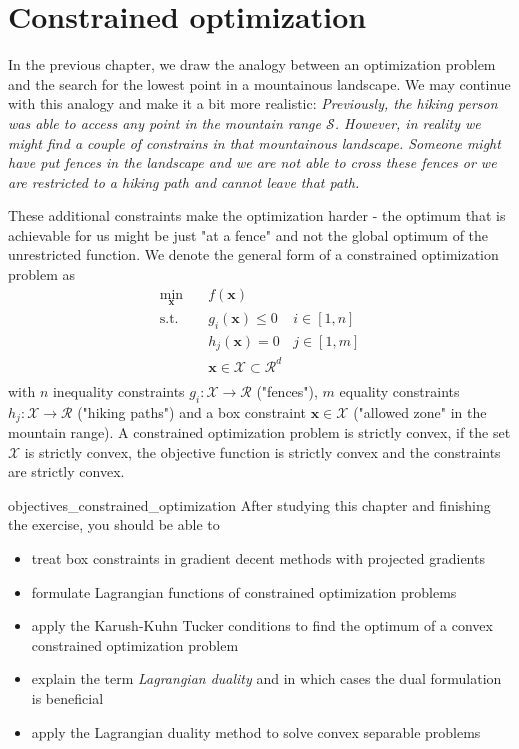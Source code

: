 \chapter{Constrained optimization}
In the previous chapter, we draw the analogy between an optimization problem and the search for the lowest point in a mountainous landscape. We may continue with this analogy and make it a bit more realistic: \emph{Previously, the hiking person was able to access any point in the mountain range $\mathcal{S}$. However, in reality we might find a couple of constrains in that mountainous landscape. Someone might have put fences in the landscape and we are not able to cross these fences or we are restricted to a hiking path and cannot leave that path.}

These additional constraints make the optimization harder - the optimum that is achievable for us might be just "at a fence" and not the global optimum of the unrestricted function.
We denote the general form of a constrained optimization problem as 
\begin{equation}
    \begin{aligned}
        \min_{\mathbf{x}} \quad & f(\mathbf{x})\\
        \textrm{s.t.} \quad & g_i(\mathbf{x}) \le 0    &i \in [1, n]\\
                            & h_j(\mathbf{x}) = 0  &j \in [1, m]\\
                            & \mathbf{x} \in \mathcal{X} \subset \mathcal{R}^d\\
    \end{aligned}
    \label{eq:constrained_optimization}
\end{equation}
with $n$ inequality constraints $g_i : \mathcal{X} \rightarrow \mathcal{R}$ ("fences"), $m$ equality constraints $h_j: \mathcal{X} \rightarrow \mathcal{R}$ ("hiking paths") and a box constraint $\mathbf{x} \in \mathcal{X}$ ("allowed zone" in the mountain range). A constrained optimization problem is strictly convex, if the set $\mathcal{X}$ is strictly convex, the objective function is strictly convex and the constraints are strictly convex.

\begin{objectives}{}{objectives_constrained_optimization}
After studying this chapter and finishing the exercise, you should be able to 
\begin{itemize}[label=$\dots$]
    \item treat box constraints in gradient decent methods with projected gradients
    \item formulate Lagrangian functions of constrained optimization problems
    \item apply the Karush-Kuhn Tucker conditions to find the optimum of a convex constrained optimization problem
    \item explain the term \emph{Lagrangian duality} and in which cases the dual formulation is beneficial
    \item apply the Lagrangian duality method to solve convex separable problems
\end{itemize}
\end{objectives}

